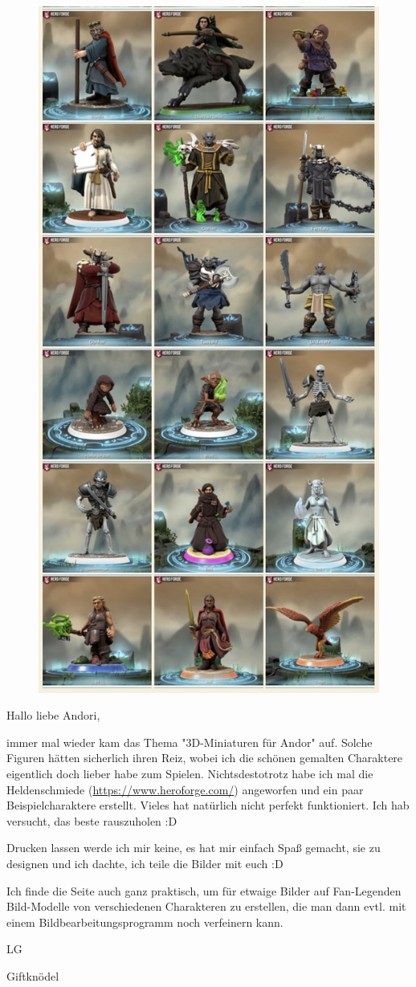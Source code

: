 {\begin{figure}[ht!]
    \includegraphics[width=0.3\linewidth]{Das Erbe des Wunderkindes/Bilder/3D mit der Heldenschmiede 4.jpg}
\end{figure}

Hallo liebe Andori,\bigskip

immer mal wieder kam das Thema "3D-Miniaturen für Andor" auf. Solche Figuren hätten sicherlich ihren Reiz, wobei ich die schönen gemalten Charaktere eigentlich doch lieber habe zum Spielen. Nichtsdestotrotz habe ich mal die Heldenschmiede (\url{https://www.heroforge.com/}) angeworfen und ein paar Beispielcharaktere erstellt. Vieles hat natürlich nicht perfekt funktioniert. Ich hab versucht, das beste rauszuholen :D

Drucken lassen werde ich mir keine, es hat mir einfach Spaß gemacht, sie zu designen und ich dachte, ich teile die Bilder mit euch :D

Ich finde die Seite auch ganz praktisch, um für etwaige Bilder auf Fan-Legenden Bild-Modelle von verschiedenen Charakteren zu erstellen, die man dann evtl. mit einem Bildbearbeitungsprogramm noch verfeinern kann.\bigskip

LG

Giftknödel


}